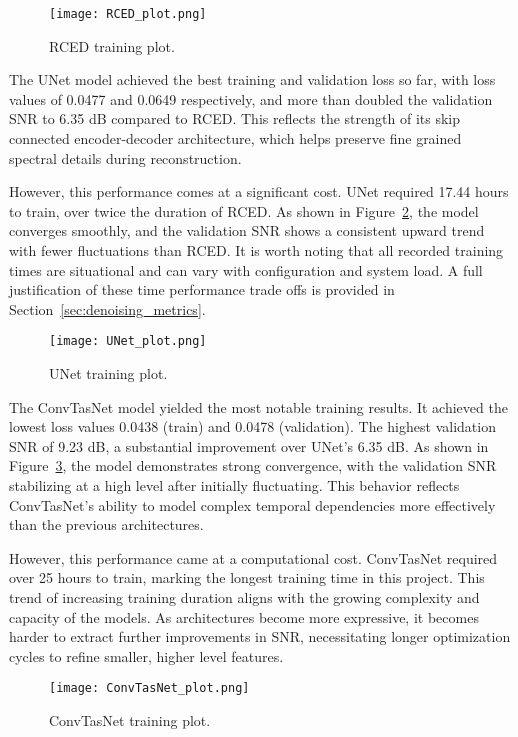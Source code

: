 \begin{figure}[H]
    \centering
    \texttt{[image: RCED\_plot.png]}
    \caption{\label{fig:rced_training_plot} RCED training plot.}
\end{figure}

The UNet model achieved the best training and validation loss so far, with loss values of 0.0477 and 0.0649 respectively, and more than doubled the validation SNR to 6.35 dB compared to RCED. This reflects the strength of its skip connected encoder-decoder architecture, which helps preserve fine grained spectral details during reconstruction.

However, this performance comes at a significant cost. UNet required 17.44 hours to train, over twice the duration of RCED. As shown in Figure~\ref{fig:unet_training_plot}, the model converges smoothly, and the validation SNR shows a consistent upward trend with fewer fluctuations than RCED. It is worth noting that all recorded training times are situational and can vary with configuration and system load. A full justification of these time performance trade offs is provided in Section~\ref{sec:denoising_metrics}.

\begin{figure}[H]
    \centering
    \texttt{[image: UNet\_plot.png]}
    \caption{\label{fig:unet_training_plot} UNet training plot.}
\end{figure}

The ConvTasNet model yielded the most notable training results. It achieved the lowest loss values 0.0438 (train) and 0.0478 (validation). The highest validation SNR of 9.23 dB, a substantial improvement over UNet’s 6.35 dB. As shown in Figure~\ref{fig:convtasnet_training_plot}, the model demonstrates strong convergence, with the validation SNR stabilizing at a high level after initially fluctuating. This behavior reflects ConvTasNet’s ability to model complex temporal dependencies more effectively than the previous architectures.

However, this performance came at a computational cost. ConvTasNet required over 25 hours to train, marking the longest training time in this project. This trend of increasing training duration aligns with the growing complexity and capacity of the models. As architectures become more expressive, it becomes harder to extract further improvements in SNR, necessitating longer optimization cycles to refine smaller, higher level features.

\begin{figure}[H]
    \centering
    \texttt{[image: ConvTasNet\_plot.png]}
    \caption{\label{fig:convtasnet_training_plot} ConvTasNet training plot.}
\end{figure}

